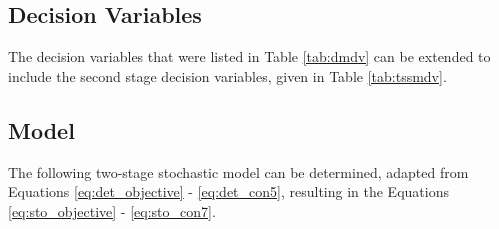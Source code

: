\documentclass[../thesis.tex]{subfiles}
\begin{document}
\subsection{Decision Variables}
The decision variables that were listed in Table \ref{tab:dmdv} can be extended to include the second stage decision variables, given in Table \ref{tab:tssmdv}.

\begin{table}[h!]
    \centering{}
    \caption{The sets used within the two-stage stochastic model where (\(b, s, h, r, k\)) represent the value number of nursing bands, specialties, hospitals, regions and scenarios, respectively}
    \label{tab:tssmdv}
\end{table}

\subsection{Model}\label{sec:stochasticmodel}
The following two-stage stochastic model can be determined, adapted from Equations \eqref{eq:det_objective} - \eqref{eq:det_con5}, resulting in the Equations \eqref{eq:sto_objective} - \eqref{eq:sto_con7}.
\end{document}
